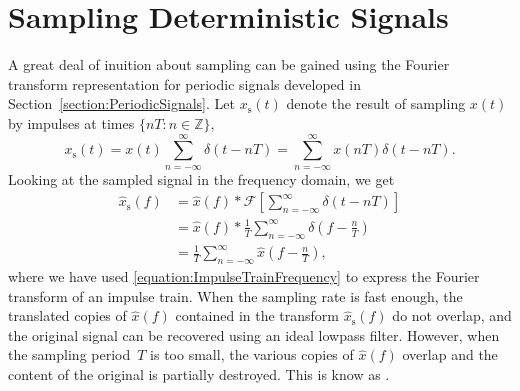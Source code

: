 \section{Sampling Deterministic Signals}

A great deal of inuition about sampling can be gained using the Fourier transform representation for periodic signals developed in Section~\ref{section:PeriodicSignals}.
Let $x_{\mathrm{s}}(t)$ denote the result of sampling $x(t)$ by impulses at times $\{ nT : n \in \mathbb{Z} \}$,
\begin{equation*}
x_{\mathrm{s}}(t) = x(t) \sum_{n=-\infty}^{\infty} \delta(t-nT)
= \sum_{n=-\infty}^{\infty} x(nT) \delta(t-nT).
\end{equation*}
Looking at the sampled signal in the frequency domain, we get
\begin{equation*}\begin{split}
\hat{x}_{\mathrm{s}}(f) &= \hat{x}(f) \ast \mathcal{F} \left[ \sum_{n=-\infty}^{\infty} \delta(t-nT) \right] \\
&= \hat{x}(f) \ast \frac{1}{T} \sum_{n=-\infty}^{\infty} \delta \left( f-\frac{n}{T} \right) \\
&= \frac{1}{T} \sum_{n=-\infty}^{\infty} \hat{x} \left( f - \frac{n}{T} \right) ,\end{split}\end{equation*}
where we have used \eqref{equation:ImpulseTrainFrequency} to express the Fourier transform of an impulse train.
When the sampling rate is fast enough, the translated copies of $\hat{x}(f)$ contained in the transform $\hat{x}_{\mathrm{s}}(f)$ do not overlap, and the original signal can be recovered using an ideal lowpass filter.
However, when the sampling period~$T$ is too small, the various copies of $\hat{x}(f)$ overlap and the content of the original is partially destroyed.
This is know as .

